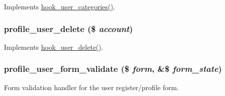 \label{profile_8module_ace541ae41831d349df58b346e5945bf1}
Implements \hyperlink{group__hooks_ga166a3fe9d203a99560d10413a880ed08}{hook\_\-user\_\-categories()}. \hypertarget{profile_8module_ab27b8c7b8ab4a0a4c7b3a74f89bf800c}{
\subsubsection[{profile\_\-user\_\-delete}]{\setlength{\rightskip}{0pt plus 5cm}profile\_\-user\_\-delete (\$ {\em account})}}
\label{profile_8module_ab27b8c7b8ab4a0a4c7b3a74f89bf800c}
Implements \hyperlink{group__hooks_ga2c0755857e486e8a770b44b496da9929}{hook\_\-user\_\-delete()}. \hypertarget{profile_8module_a7fc102eb762973087f36295f8427df14}{
\subsubsection[{profile\_\-user\_\-form\_\-validate}]{\setlength{\rightskip}{0pt plus 5cm}profile\_\-user\_\-form\_\-validate (\$ {\em form}, \/  \&\$ {\em form\_\-state})}}
\label{profile_8module_a7fc102eb762973087f36295f8427df14}
Form validation handler for the user register/profile form.

